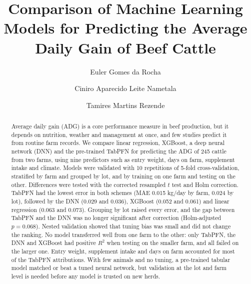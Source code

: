 \documentclass[runningheads]{llncs}
\newif\ifanon
\begin{document}
%
\title{Comparison of Machine Learning Models for Predicting the Average Daily Gain of Beef Cattle}
%
%
\ifanon
\author{Anonymous Authors}
\authorrunning{Anonymous}
\institute{Anonymous Institution}
\else
\author{Euler Gomes da Rocha \and
Ciniro Aparecido Leite Nametala \and
Tamires Martins Rezende}
%
%
\fi
%
\maketitle              %
%
\begin{abstract}
Average daily gain (ADG) is a core performance measure in beef production, but it depends on nutrition, weather and management at once, and few studies predict it from routine farm records. We compare linear regression, XGBoost, a deep neural network (DNN) and the pre-trained TabPFN for predicting the ADG of 245 cattle from two farms, using nine predictors such as entry weight, days on farm, supplement intake and climate. Models were validated with 10 repetitions of 5-fold cross-validation, stratified by farm and grouped by lot, and by training on one farm and testing on the other. Differences were tested with the corrected resampled $t$ test and Holm correction. TabPFN had the lowest error in both schemes (MAE 0.015 kg/day by farm, 0.024 by lot), followed by the DNN (0.029 and 0.036), XGBoost (0.052 and 0.061) and linear regression (0.063 and 0.073). Grouping by lot raised every error, and the gap between TabPFN and the DNN was no longer significant after correction (Holm-adjusted $p=0.068$). Nested validation showed that tuning bias was small and did not change the ranking. No model transferred well from one farm to the other: only TabPFN, the DNN and XGBoost had positive $R^2$ when testing on the smaller farm, and all failed on the larger one. Entry weight, supplement intake and days on farm accounted for most of the TabPFN attributions. With few animals and no tuning, a pre-trained tabular model matched or beat a tuned neural network, but validation at the lot and farm level is needed before any model is trusted on new herds.

\end{abstract}
%
%
%
\end{document}
